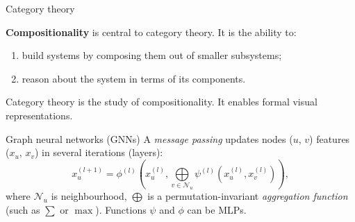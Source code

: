 \documentclass[10pt,aspectratio=169]{beamer}
\begin{document}
\begin{frame}{Category theory}

\textbf{Compositionality} is central to category theory. It is the ability to:
\begin{enumerate}
\item build systems by composing them out of smaller subsystems;
\item reason about the system in terms of its components.
\end{enumerate}

\vspace{2ex}

Category theory is the study of compositionality. It enables formal visual representations.
\end{frame}

\begin{frame}{Graph neural networks (GNNs)}
A \emph{message passing} updates nodes ($u$, $v$) features ($x_u$,
$x_v$) in several iterations (layers):
\begin{equation*}
    x^{(l + 1)}_u = \phi^{(l)} \left(x^{(l)}_u, \bigoplus\limits_{v \in \mathcal{N}_u} \psi^{(l)}(x^{(l)}_u, x^{(l)}_v)\right),
\end{equation*}
where $\mathcal{N}_u$ is neighbourhood, $\bigoplus$ is a
permutation-invariant \emph{aggregation function} (such as $\sum$ or
$\max$). Functions $\psi$ and $\phi$ can be MLPs.

\end{frame}

\begin{frame}[allowframebreaks]
  
  
  \nocite{*}
\end{frame}
\end{document}
